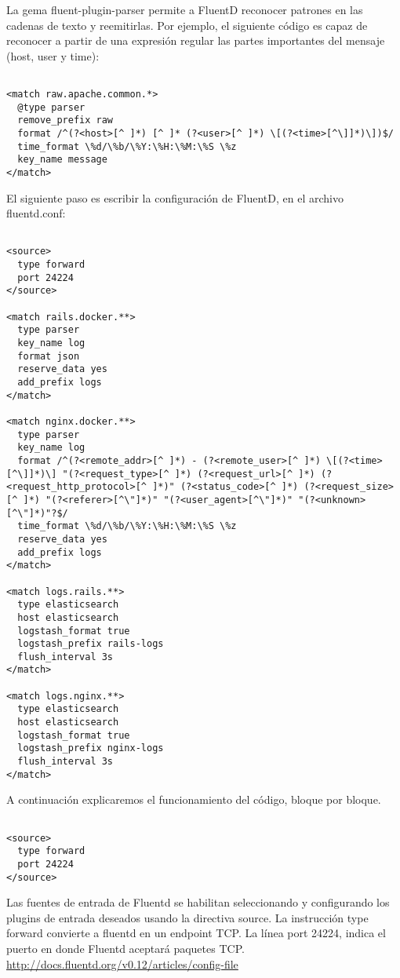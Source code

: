 La gema fluent-plugin-parser permite a FluentD reconocer patrones en las
cadenas de texto y reemitirlas. Por ejemplo, el siguiente código es capaz de
reconocer a partir de una expresión regular las partes importantes del mensaje
(host, user y time):

\begin{lstlisting}

<match raw.apache.common.*>
  @type parser
  remove_prefix raw
  format /^(?<host>[^ ]*) [^ ]* (?<user>[^ ]*) \[(?<time>[^\]]*)\])$/
  time_format \%d/\%b/\%Y:\%H:\%M:\%S \%z
  key_name message
</match>

\end{lstlisting}

El siguiente paso es escribir la configuración de FluentD, en el archivo
fluentd.conf:

\begin{lstlisting}

<source>
  type forward
  port 24224
</source>

<match rails.docker.**>
  type parser
  key_name log
  format json
  reserve_data yes
  add_prefix logs
</match>

<match nginx.docker.**>
  type parser
  key_name log
  format /^(?<remote_addr>[^ ]*) - (?<remote_user>[^ ]*) \[(?<time>[^\]]*)\] "(?<request_type>[^ ]*) (?<request_url>[^ ]*) (?<request_http_protocol>[^ ]*)" (?<status_code>[^ ]*) (?<request_size>[^ ]*) "(?<referer>[^\"]*)" "(?<user_agent>[^\"]*)" "(?<unknown>[^\"]*)"?$/
  time_format \%d/\%b/\%Y:\%H:\%M:\%S \%z
  reserve_data yes
  add_prefix logs
</match>

<match logs.rails.**>
  type elasticsearch
  host elasticsearch
  logstash_format true
  logstash_prefix rails-logs
  flush_interval 3s
</match>

<match logs.nginx.**>
  type elasticsearch
  host elasticsearch
  logstash_format true
  logstash_prefix nginx-logs
  flush_interval 3s
</match>

\end{lstlisting}

A continuación explicaremos el funcionamiento del código, bloque por bloque.

\begin{lstlisting}

<source>
  type forward
  port 24224
</source>

\end{lstlisting}

Las fuentes de entrada de Fluentd se habilitan seleccionando y configurando los
plugins de entrada deseados usando la directiva source. La instrucción type
forward convierte a fluentd en un endpoint TCP. La línea port 24224, indica el
puerto en donde Fluentd aceptará paquetes TCP.
\url{http://docs.fluentd.org/v0.12/articles/config-file}

